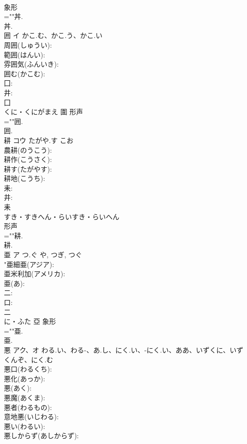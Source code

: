 \documentclass[8pt]{extreport}
\begin{document}
\begin{CJK}{UTF8}{min}
\\	象形 
\\	=""丼.
\\	丼.
\\	囲	イ	かこ.む、かこ.う、かこ.い		
\\	周囲(しゅうい): 
\\	範囲(はんい): 
\\	雰囲気(ふんいき): 
\\	囲む(かこむ): 
\\	囗: 
\\	井: 
\\	囗	
\\	くに・くにがまえ	圍	形声 
\\	=""囲.
\\	囲.
\\	耕	コウ	たがや.す	こお	
\\	農耕(のうこう): 
\\	耕作(こうさく): 
\\	耕す(たがやす): 
\\	耕地(こうち): 
\\	耒: 
\\	井: 
\\	耒	
\\	すき・すきへん・らいすき・らいへん	
\\	形声 
\\	=""耕.
\\	耕.
\\	亜	ア	つ.ぐ	や, つぎ, つぐ	
\\	"亜細亜(アジア): 
\\	亜米利加(アメリカ): 
\\	亜(あ): 
\\	二: 
\\	口: 
\\	二	
\\	に・ふた	亞	象形 
\\	=""亜.
\\	亜.
\\	悪	アク、オ	わる.い、わる-、あ.し、にく.い、-にく.い、ああ、いずくに、いずくんぞ、にく.む		
\\	悪口(わるくち): 
\\	悪化(あっか): 
\\	悪(あく): 
\\	悪魔(あくま): 
\\	悪者(わるもの): 
\\	意地悪(いじわる): 
\\	悪い(わるい): 
\\	悪しからず(あしからず): 

\end{CJK}
\end{document}
